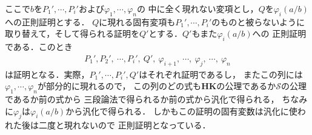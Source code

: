 \begin{metaprf}
\begin{description}
				ここで$b$を$P_{1}',\cdots,P_{i}'$および$\varphi_{1},\cdots,\varphi_{n}$の
				中に全く現れない変項とし，$Q$を$\varphi_{i}(a/b)$への正則証明とする．
				$Q$に現れる固有変項も$P_{1}',\cdots,P_{i}'$のものと被らないように
				取り替えて，そして得られる証明を$Q'$とする．$Q'$もまた$\varphi_{i}(a/b)$への
				正則証明である．このとき
				\begin{align}
					P_{1}',P_{2}',\ \cdots,P_{i}',\ Q',\ \varphi_{i+1},\ 
					\cdots,\ \varphi_{j},\ \cdots,\ \varphi_{n}
				\end{align}
				は証明となる．実際，$P_{1}',\cdots,P_{i}',Q'$はそれぞれ証明であるし，
				またこの列には$\varphi_{1},\cdots,\varphi_{n}$が部分的に現れるので，
				この列のどの式も{\bf HK}の公理であるか$\mathscr{S}$の公理であるか前の式から
				三段論法で得られるか前の式から汎化で得られる，
				ちなみに$\varphi_{j}$は$\varphi_{i}(a/b)$から汎化で得られる．
				しかもこの証明の固有変数は汎化に使われた後は二度と現れないので
				正則証明となっている．
				\QED
		\end{description}
	\end{metaprf}
	
